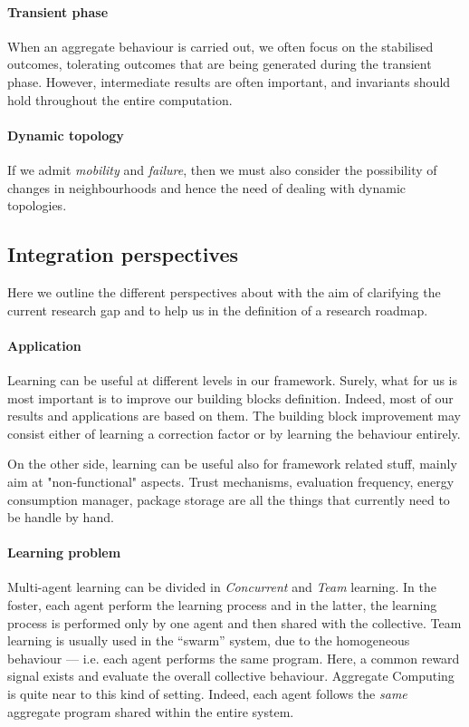 \documentclass[
  twocolumn,
]{ceurart}
\begin{document}
\paragraph{Transient phase}
%
When an aggregate behaviour is carried out,
 we often focus on the stabilised outcomes,
 tolerating outcomes that are being generated
 during the transient phase.
%
However, intermediate results are often important,
 and invariants should hold throughout the entire computation.

\paragraph{Dynamic topology}
%
If we admit \emph{mobility} and \emph{failure},
 then we must also consider 
 the possibility of changes in neighbourhoods
 and hence the need of dealing with dynamic topologies.


\subsection{Integration perspectives}
Here we outline the different perspectives about \hybridaggregate{} with the aim
 of clarifying the current research gap and to help us in the definition of a research roadmap.
%
\paragraph{Application} Learning can be useful at different levels in our framework.
 Surely, what for us is most important is to improve our building blocks definition.
% 
Indeed, most of our results and applications are based on them.
%
The building block improvement may consist either of learning a correction factor or by learning the behaviour entirely.

On the other side, learning can be useful also for framework related stuff,
 mainly aim at "non-functional" aspects. 
 Trust mechanisms, evaluation frequency, energy consumption manager, package storage are all the things that currently need to be handle by hand.
 
\paragraph{Learning problem} 
Multi-agent learning can be divided in \textit{Concurrent} and \textit{Team} learning. 
In the foster, each agent perform the learning process and in the latter,
 the learning process is performed only by one agent and then shared with the collective.
% 
Team learning is usually used in the ``swarm'' system, due to the homogeneous behaviour 
 --- i.e. each agent performs the same program. 
 Here, a common reward signal exists and evaluate the overall collective behaviour.
 Aggregate Computing is quite near to this kind of setting.
% 
Indeed, each agent follows the \textit{same} aggregate program shared within the entire system.
\end{document}
